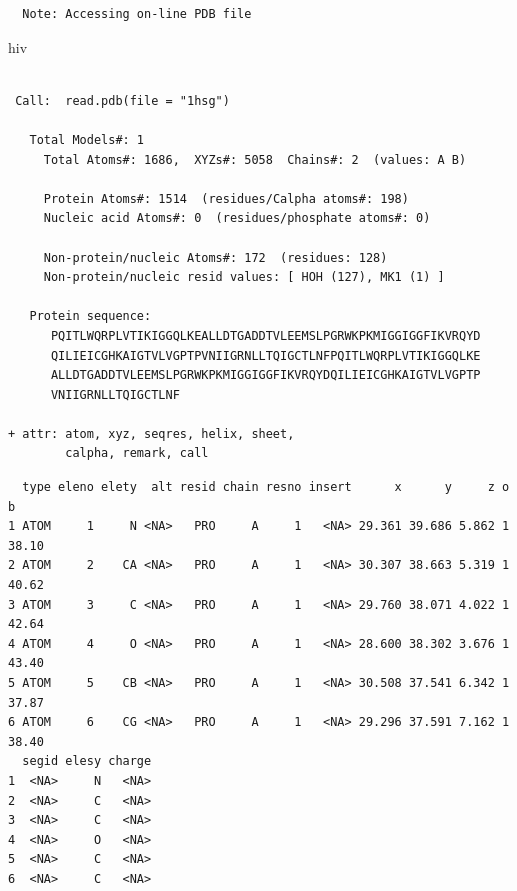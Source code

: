 \documentclass[
  letterpaper,
  DIV=11,
  numbers=noendperiod]{scrartcl}
\newenvironment{Shaded}{\begin{snugshade}}{\end{snugshade}}
\newcommand{\FunctionTok}[1]{\textcolor[rgb]{0.28,0.35,0.67}{#1}}
\newcommand{\NormalTok}[1]{\textcolor[rgb]{0.00,0.23,0.31}{#1}}
\newcommand{\SpecialCharTok}[1]{\textcolor[rgb]{0.37,0.37,0.37}{#1}}
\begin{document}
\begin{verbatim}
  Note: Accessing on-line PDB file
\end{verbatim}

\begin{Shaded}
\begin{Highlighting}[]
\NormalTok{hiv}
\end{Highlighting}
\end{Shaded}

\begin{verbatim}

 Call:  read.pdb(file = "1hsg")

   Total Models#: 1
     Total Atoms#: 1686,  XYZs#: 5058  Chains#: 2  (values: A B)

     Protein Atoms#: 1514  (residues/Calpha atoms#: 198)
     Nucleic acid Atoms#: 0  (residues/phosphate atoms#: 0)

     Non-protein/nucleic Atoms#: 172  (residues: 128)
     Non-protein/nucleic resid values: [ HOH (127), MK1 (1) ]

   Protein sequence:
      PQITLWQRPLVTIKIGGQLKEALLDTGADDTVLEEMSLPGRWKPKMIGGIGGFIKVRQYD
      QILIEICGHKAIGTVLVGPTPVNIIGRNLLTQIGCTLNFPQITLWQRPLVTIKIGGQLKE
      ALLDTGADDTVLEEMSLPGRWKPKMIGGIGGFIKVRQYDQILIEICGHKAIGTVLVGPTP
      VNIIGRNLLTQIGCTLNF

+ attr: atom, xyz, seqres, helix, sheet,
        calpha, remark, call
\end{verbatim}

\begin{Shaded}
\end{Shaded}

\begin{verbatim}
  type eleno elety  alt resid chain resno insert      x      y     z o     b
1 ATOM     1     N <NA>   PRO     A     1   <NA> 29.361 39.686 5.862 1 38.10
2 ATOM     2    CA <NA>   PRO     A     1   <NA> 30.307 38.663 5.319 1 40.62
3 ATOM     3     C <NA>   PRO     A     1   <NA> 29.760 38.071 4.022 1 42.64
4 ATOM     4     O <NA>   PRO     A     1   <NA> 28.600 38.302 3.676 1 43.40
5 ATOM     5    CB <NA>   PRO     A     1   <NA> 30.508 37.541 6.342 1 37.87
6 ATOM     6    CG <NA>   PRO     A     1   <NA> 29.296 37.591 7.162 1 38.40
  segid elesy charge
1  <NA>     N   <NA>
2  <NA>     C   <NA>
3  <NA>     C   <NA>
4  <NA>     O   <NA>
5  <NA>     C   <NA>
6  <NA>     C   <NA>
\end{verbatim}
\end{document}
